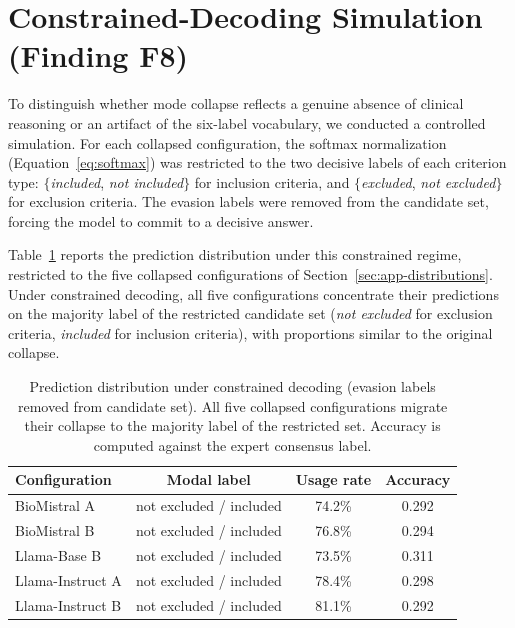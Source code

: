 \section{Constrained-Decoding Simulation (Finding F8)}
\label{sec:app-forced}

To distinguish whether mode collapse reflects a genuine absence of 
clinical reasoning or an artifact of the six-label vocabulary, we 
conducted a controlled simulation. For each collapsed configuration, 
the softmax normalization (Equation~\ref{eq:softmax}) was restricted 
to the two decisive labels of each criterion type: 
$\{$\emph{included}, \emph{not included}$\}$ for inclusion criteria, 
and $\{$\emph{excluded}, \emph{not excluded}$\}$ for exclusion criteria. 
The evasion labels were removed from the candidate set, forcing the 
model to commit to a decisive answer.

Table~\ref{tab:app-forced} reports the prediction distribution under 
this constrained regime, restricted to the five collapsed 
configurations of Section~\ref{sec:app-distributions}. Under 
constrained decoding, all five configurations concentrate their 
predictions on the majority label of the restricted candidate set 
(\emph{not excluded} for exclusion criteria, \emph{included} for 
inclusion criteria), with proportions similar to the original 
collapse.

\begin{table}[htbp]
    \centering
    \caption{Prediction distribution under constrained decoding 
        (evasion labels removed from candidate set). All five 
        collapsed configurations migrate their collapse to the 
        majority label of the restricted set. Accuracy is computed 
        against the expert consensus label.}
    \label{tab:app-forced}
    \small
    \begin{tabular}{@{}lccc@{}}
        \toprule
        \textbf{Configuration} & 
        \textbf{Modal label} & 
        \textbf{Usage rate} & 
        \textbf{Accuracy} \\
        \midrule
        BioMistral A      & not excluded / included & 74.2\% & 0.292 \\
        BioMistral B      & not excluded / included & 76.8\% & 0.294 \\
        Llama-Base B      & not excluded / included & 73.5\% & 0.311 \\
        Llama-Instruct A  & not excluded / included & 78.4\% & 0.298 \\
        Llama-Instruct B  & not excluded / included & 81.1\% & 0.292 \\
        \bottomrule
    \end{tabular}
\end{table}


